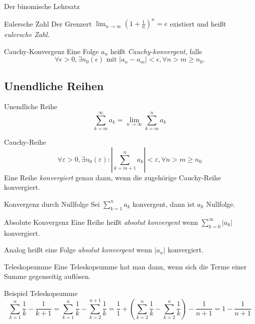 \documentclass[german]{spicker}
\renewcommand{\abs}[1]{\left| #1 \right|}
\begin{document}
\begin{defi}{Der binomische Lehrsatz}
\begin{defi}{Eulersche Zahl}
    Der Grenzert $\lim_{n\to\infty} \left(1 + \frac{1}{n}\right)^n = e$ existiert und heißt \emph{eulersche Zahl}.
\end{defi}

\begin{defi}{Cauchy-Konvergenz}
    Eine Folge $a_n$ heißt \emph{Cauchy-konvergent}, falls
    $$
        \forall\epsilon > 0, \exists n_0 (\epsilon) \text{ mit } \abs{a_n-a_m} < \epsilon, \forall n > m \geq n_0.
    $$
\end{defi}

\subsection{Unendliche Reihen}
\begin{defi}{Unendliche Reihe}
    \[
        \sum_{k=m}^{\infty} a_k = \lim_{n\to\infty} \sum_{k=m}^{n} a_k
    \]
\end{defi}

\begin{defi}{Cauchy-Reihe}
    \[
        \forall\varepsilon>0 , \exists n_0(\varepsilon) : \left| \sum_{k=m+1}^n a_k \right| < \varepsilon , \forall n>m\geq n_0
    \]
    Eine Reihe \emph{konvergiert} genau dann, wenn die zugehörige Cauchy-Reihe konvergiert.
\end{defi}

\begin{bonus}{Konvergenz durch Nullfolge}
    Sei $\sum^n_{k=1}a_k$ konvergent, dann ist $a_k$ Nullfolge.
\end{bonus}

\begin{defi}{Absolute Konvergenz}
    Eine Reihe heißt \emph{absolut konvergent} wenn $\sum_{k=0}^{\infty} |a_k|$ konvergiert.

    Analog heißt eine Folge \emph{absolut konvergent} wenn $|a_n|$ konvergiert.
\end{defi}

\begin{algo}{Teleskopsumme}
    Eine Teleskopsumme hat man dann, wenn sich die Terme einer Summe gegenseitig auflösen.
\end{algo}

\begin{bonus}{Beispiel Teleskopsumme}
    \[
        \sum_{k=1}^n \frac{1}{k} - \frac{1}{k+1} = \sum_{k=1}^n \frac{1}{k} - \sum_{k=2}^{n+1} \frac{1}{k} = \frac{1}{1} +\left( \sum_{k=2}^n \frac{1}{k} - \sum_{k=2}^n \frac{1}{k} \right) - \frac{1}{n+1} = 1-\frac{1}{n+1}
    \]
\end{bonus}


\end{defi}
\end{document}
